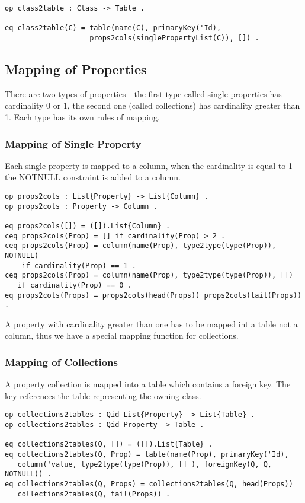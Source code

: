 \documentclass[11pt]{article}
\begin{document}
\begin{verbatim}
op class2table : Class -> Table .

eq class2table(C) = table(name(C), primaryKey('Id), 
                    props2cols(singlePropertyList(C)), []) .
\end{verbatim}

\subsection{Mapping of Properties}
There are two types of properties - the first type called single properties has cardinality 0 or 1, the second one (called collections) has cardinality greater than 1. Each type has its own rules of mapping.

\subsubsection{Mapping of Single Property}
Each single property is mapped to a column, when the cardinality is equal to 1 the NOTNULL constraint is added to a column. 
\begin{verbatim}
op props2cols : List{Property} -> List{Column} .
op props2cols : Property -> Column .

eq props2cols([]) = ([]).List{Column} .
ceq props2cols(Prop) = [] if cardinality(Prop) > 2 .
ceq props2cols(Prop) = column(name(Prop), type2type(type(Prop)), NOTNULL)
    if cardinality(Prop) == 1 .
ceq props2cols(Prop) = column(name(Prop), type2type(type(Prop)), []) 
   if cardinality(Prop) == 0 .
eq props2cols(Props) = props2cols(head(Props)) props2cols(tail(Props)) .
\end{verbatim}
A property with cardinality greater than one has to be mapped int a table not a column, thus we have a special mapping function for collections.

\subsubsection{Mapping of Collections}
A property collection is mapped into a table which contains a foreign key. The key references the table representing the owning class.
\begin{verbatim}
op collections2tables : Qid List{Property} -> List{Table} .
op collections2tables : Qid Property -> Table . 

eq collections2tables(Q, []) = ([]).List{Table} .
eq collections2tables(Q, Prop) = table(name(Prop), primaryKey('Id), 
   column('value, type2type(type(Prop)), [] ), foreignKey(Q, Q, NOTNULL)) .
eq collections2tables(Q, Props) = collections2tables(Q, head(Props)) 
   collections2tables(Q, tail(Props)) .
\end{verbatim}
\end{document}
